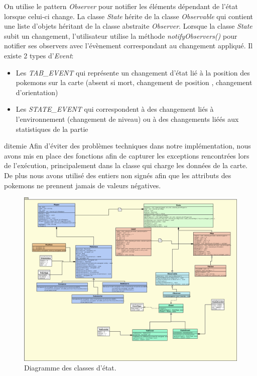 \documentclass[a4paper,12pt]{article}
\begin{document}
     On utilise le pattern \emph{Observer} pour notifier les éléments dépendant de l'état lorsque celui-ci change. La classe \emph{State} hérite de la classe \emph{Observable} qui contient une liste d'objets héritant de la classe abstraite \emph{Observer}. Lorsque la classe \emph{State} subit un changement, l'utilisateur utilise la méthode \emph{notifyObservers()} pour notifier ses observers avec l'évènement correspondant au changement appliqué.
     Il existe 2 types d'\emph{Event}:
\begin{itemize}
\item Les \emph{TAB\_EVENT} qui représente un changement d'état lié à la position des pokemons sur la carte (absent si mort, changement de position , changement d'orientation)
\item Les \emph{STATE\_EVENT} qui correspondent à des changement liés à l'environnement (changement de niveau) ou à des changements liéés aux statistiques de la partie
\end{itemize}
     d{itemie}
  Afin d'éviter des problèmes techniques dans notre implémentation, nous avons mis en place des fonctions afin de capturer les exceptions rencontrées lors de l'exécution, principalement dans la classe qui charge les données de la carte. De plus nous avons utilisé des entiers non signés afin que les attributs des pokemons ne prennent jamais de valeurs négatives.
    
    \begin{landscape}
    \begin{figure}[p]
    \includegraphics[width=0.8\paperheight]{state.png}
    \caption{\label{uml:state}Diagramme des classes d'état.}
    \end{figure}
    \end{landscape}
    \clearpage
    
\end{document}
